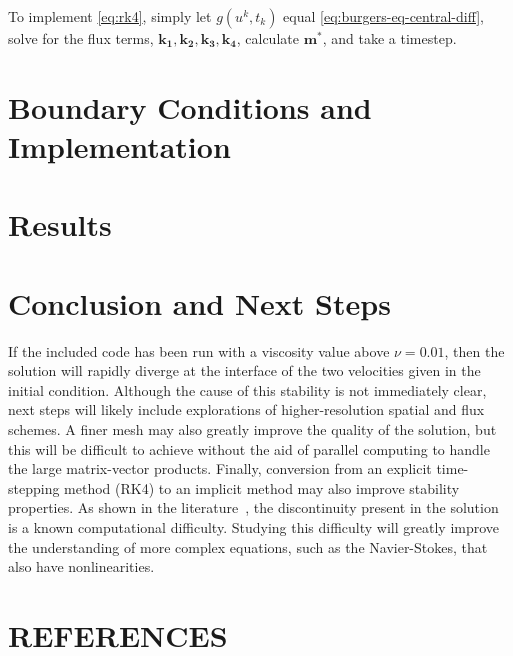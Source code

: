 \documentclass[ltr]{ornltm-app-mod} %
\numberwithin{equation}{section}
\begin{document}
    To implement \cref{eq:rk4}, simply let $g(u^k,t_k)$ equal \cref{eq:burgers-eq-central-diff}, solve for the flux terms, $\mathbf{k_1},\mathbf{k_2},\mathbf{k_3},\mathbf{k_4}$, calculate $\mathbf{m^*}$, and take a timestep.


    \section{Boundary Conditions and Implementation}\label{sec:boundary-conditions-and-implementation}
    


    \section{Results}\label{sec:results}
    
    \clearpage


    \section{Conclusion and Next Steps}\label{sec:conclusion}
    If the included code has been run with a viscosity value above $\nu=0.01$, then the solution will rapidly diverge at the interface of the two velocities given in the initial condition.
    Although the cause of this stability is not immediately clear, next steps will likely include explorations of higher-resolution spatial and flux schemes.
    A finer mesh may also greatly improve the quality of the solution, but this will be difficult to achieve without the aid of parallel computing to handle the large matrix-vector products.
    Finally, conversion from an explicit time-stepping method (RK4) to an implicit method may also improve stability properties.
    As shown in the literature~\autocite{cameronNOTESBURGERSEQUATION,salihBurgersEquation2016}, the discontinuity present in the solution is a known computational difficulty.
    Studying this difficulty will greatly improve the understanding of more complex equations, such as the Navier-Stokes, that also have nonlinearities.





    \section{REFERENCES}%
    \printbibliography[heading=none]%
\end{document}
